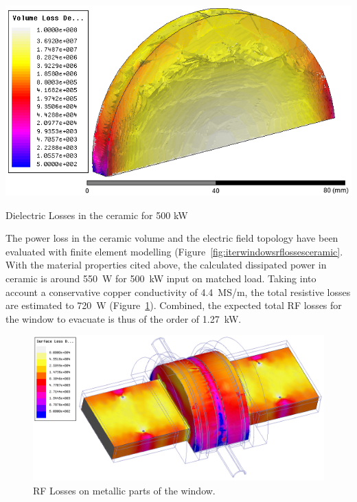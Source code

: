 \begin{marginfigure}
	\centering
	\includegraphics[width=1.0\linewidth]{figures/chap3/ITER_window/ITER_windows_RFlosses_ceramic}
	\caption{Dielectric Losses in the ceramic for 500 kW}
	\label{fig:iterwindowsrflossesceramic}
\end{marginfigure}

The power loss in the ceramic volume and the electric field topology have been evaluated with finite element modelling (Figure~\ref{fig:iterwindowsrflossesceramic}. With the material properties cited above, the calculated dissipated power in ceramic is around 550~W for 500~kW input on matched load. Taking into account a conservative copper conductivity of 4.4~MS/m, the total resistive losses are estimated to 720~W (Figure~\ref{fig:iterwindowsrflosses}). Combined, the expected total RF losses for the window to evacuate is thus of the order of 1.27~kW. 

\begin{figure}
	\centering
	\includegraphics[width=1.0\linewidth]{figures/chap3/ITER_window/ITER_windows_RFlosses}
	\caption{RF Losses on metallic parts of the window.}
	\label{fig:iterwindowsrflosses}
\end{figure}


